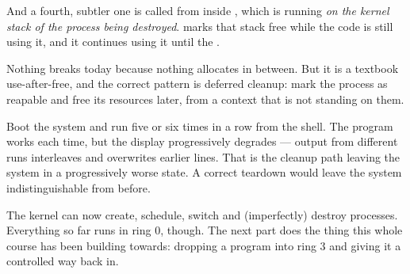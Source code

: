 \begin{concept}{And a fourth, subtler one}
 is called from inside , which is running \emph{on the
kernel stack of the process being destroyed}.  marks that stack free while
the code is still using it, and it continues using it until the .

Nothing breaks today because nothing allocates in between. But it is a textbook use-after-free, and
the correct pattern is deferred cleanup: mark the process as reapable and free its resources later,
from a context that is not standing on them.
\end{concept}

\begin{tryit}
Boot the system and run  five or six times in a row from the shell. The
program works each time, but the display progressively degrades --- output from different runs
interleaves and overwrites earlier lines. That is the cleanup path leaving the system in a
progressively worse state. A correct teardown would leave the system indistinguishable from before.
\end{tryit}

\begin{summary}
The kernel can now create, schedule, switch and (imperfectly) destroy processes. Everything so far
runs in ring 0, though. The next part does the thing this whole course has been building towards:
dropping a program into ring 3 and giving it a controlled way back in.
\end{summary}
